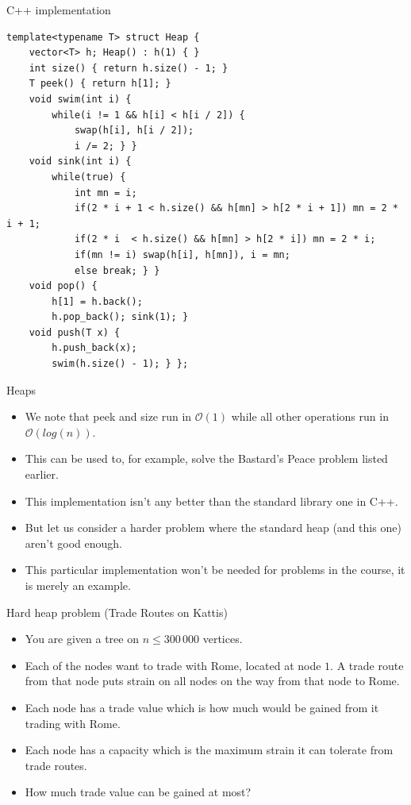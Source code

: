 \documentclass{beamer}
\begin{document}
\begin{frame}{C++ implementation}
    \scriptsize
    \begin{verbatim}
template<typename T> struct Heap {
    vector<T> h; Heap() : h(1) { }
    int size() { return h.size() - 1; }
    T peek() { return h[1]; }
    void swim(int i) {
        while(i != 1 && h[i] < h[i / 2]) {
            swap(h[i], h[i / 2]);
            i /= 2; } }
    void sink(int i) {
        while(true) {
            int mn = i;
            if(2 * i + 1 < h.size() && h[mn] > h[2 * i + 1]) mn = 2 * i + 1;
            if(2 * i  < h.size() && h[mn] > h[2 * i]) mn = 2 * i;
            if(mn != i) swap(h[i], h[mn]), i = mn;
            else break; } }
    void pop() {
        h[1] = h.back();
        h.pop_back(); sink(1); }
    void push(T x) {
        h.push_back(x);
        swim(h.size() - 1); } };
    \end{verbatim}
\end{frame}

\begin{frame}[plain]{Heaps}
    \begin{itemize}
        \item We note that peek and size run in $\mathcal{O}(1)$ while all other operations run in $\mathcal{O}(log(n))$.
        \item This can be used to, for example, solve the Bastard's Peace problem listed earlier.
        \item This implementation isn't any better than the standard library one in C++.
        \item But let us consider a harder problem where the standard heap (and this one) aren't good enough.
        \item This particular implementation won't be needed for problems in the course, it is merely an example.
    \end{itemize}
\end{frame}

\begin{frame}[plain]{Hard heap problem (Trade Routes on Kattis)}
    \begin{itemize}
        \item You are given a tree on $n \leq 300\,000$ vertices.
        \item Each of the nodes want to trade with Rome, located at node $1$. A trade route from that node puts strain on all nodes on the way from that node to Rome.
        \item Each node has a trade value which is how much would be gained from it trading with Rome.
        \item Each node has a capacity which is the maximum strain it can tolerate from trade routes.
        \item How much trade value can be gained at most?
    \end{itemize}
\end{frame}
\end{document}
